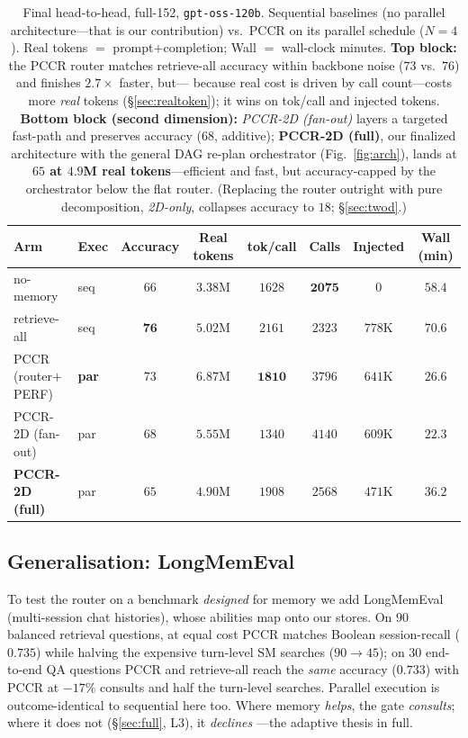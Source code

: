 \documentclass[10pt,twocolumn]{article}
\newcommand{\code}[1]{\texttt{\small #1}}
\begin{document}
\begin{table}[t]
\centering\small
\setlength{\tabcolsep}{8pt}
\renewcommand{\arraystretch}{1.15}
\begin{tabular}{@{}llcccccc@{}}
\toprule
Arm & Exec & Accuracy & Real tokens & tok/call & Calls & Injected & Wall (min) \\
\midrule
no-memory              & seq          & $66$ & $\mathbf{3.38}$M & $1628$ & $\mathbf{2075}$ & $0$    & $58.4$ \\
retrieve-all           & seq          & $\mathbf{76}$ & $5.02$M & $2161$ & $2323$ & $778$K & $70.6$ \\
PCCR (router$+$PERF)   & \textbf{par} & $73$ & $6.87$M & $\mathbf{1810}$ & $3796$ & $641$K & $\mathbf{26.6}$ \\
\midrule
PCCR-2D (fan-out)      & par          & $68$ & $5.55$M & $1340$ & $4140$ & $609$K & $22.3$ \\
\textbf{PCCR-2D (full)}& par          & $65$ & $\mathbf{4.90}$M & $1908$ & $2568$ & $471$K & $36.2$ \\
\bottomrule
\end{tabular}
\caption{Final head-to-head, full-152, \code{gpt-oss-120b}. Sequential baselines (no parallel
architecture---that is our contribution) vs.\ PCCR on its parallel schedule ($N{=}4$). Real tokens $=$
prompt$+$completion; Wall $=$ wall-clock minutes. \textbf{Top block:} the PCCR router matches
retrieve-all accuracy within backbone noise ($73$ vs.\ $76$) and finishes $2.7\times$ faster, but---
because real cost is driven by call count---costs more \emph{real} tokens (\S\ref{sec:realtoken});
it wins on tok/call and injected tokens. \textbf{Bottom block (second dimension):} \emph{PCCR-2D
(fan-out)} layers a targeted fast-path and preserves accuracy ($68$, additive); \textbf{PCCR-2D (full)},
our finalized architecture with the general DAG re-plan orchestrator (Fig.~\ref{fig:arch}), lands at
\textbf{$65$ at $4.9$M real tokens}---efficient and fast, but accuracy-capped by the orchestrator below
the flat router. (Replacing the router outright with pure decomposition, \emph{2D-only}, collapses
accuracy to $18$; \S\ref{sec:twod}.)}
\label{tab:final}
\end{table}

\subsection{Generalisation: LongMemEval}\label{sec:lme}
To test the router on a benchmark \emph{designed} for memory we add
LongMemEval~\cite{longmemeval} (multi-session chat histories), whose abilities map onto our stores.
On $90$ balanced retrieval questions, at equal cost PCCR matches Boolean session-recall ($0.735$) while
halving the expensive turn-level SM searches ($90{\to}45$); on $30$ end-to-end QA questions PCCR and
retrieve-all reach the \emph{same} accuracy ($0.733$) with PCCR at $-17\%$ consults and half the
turn-level searches. Parallel execution is outcome-identical to sequential here too. Where memory
\emph{helps}, the gate \emph{consults}; where it does not (\S\ref{sec:full}, L3), it \emph{declines}
---the adaptive thesis in full.
\end{document}
